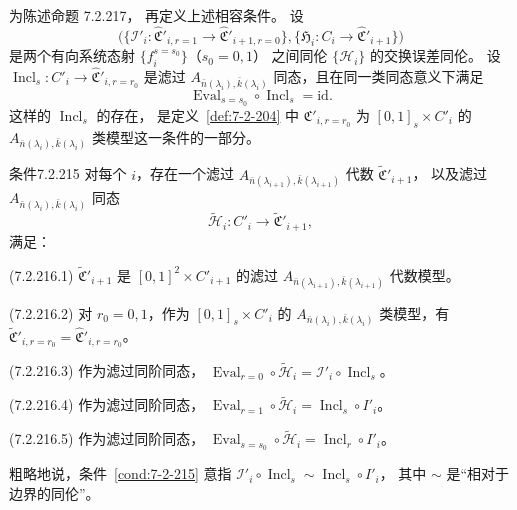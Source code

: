 为陈述命题 7.2.217，
再定义上述相容条件。
设
\[
\bigl(
\{\mathcal I'_i\colon
\widehat{\mathfrak C}'_{i,r=1}
\to\widehat{\mathfrak C}'_{i+1,r=0}\},
\{\mathfrak H_i\colon C_i\to
\widehat{\mathfrak C}'_{i+1}\}
\bigr)
\]
是两个有向系统态射
$\{f_i^{s=s_0}\}$（$s_0=0,1$）
之间同伦 $\{\mathcal H_i\}$ 的交换误差同伦。
设 $\operatorname{Incl}_s\colon C'_i\to
\widehat{\mathfrak C}'_{i,r=r_0}$
是滤过
$A_{\bar n(\lambda_i),\bar k(\lambda_i)}$
同态，且在同一类同态意义下满足
\[
\operatorname{Eval}_{s=s_0}
\circ\operatorname{Incl}_s=\mathrm{id}.
\]
这样的 $\operatorname{Incl}_s$ 的存在，
是定义~\ref{def:7-2-204} 中
$\widehat{\mathfrak C}'_{i,r=r_0}$
为 $[0,1]_s\times C'_i$ 的
$A_{\bar n(\lambda_i),\bar k(\lambda_i)}$
类模型这一条件的一部分。

\begin{statement}{条件}{7.2.215}\label{cond:7-2-215}
对每个 $i$，存在一个滤过
$A_{\bar n(\lambda_{i+1}),\bar k(\lambda_{i+1})}$
代数 $\widetilde{\mathfrak C}'_{i+1}$，
以及滤过
$A_{\bar n(\lambda_i),\bar k(\lambda_i)}$
同态
\[
\widetilde{\mathcal H}_i\colon C'_i
\longrightarrow\widetilde{\mathfrak C}'_{i+1},
\]
满足：

\noindent\textup{(7.2.216.1)}
$\widetilde{\mathfrak C}'_{i+1}$ 是
$[0,1]^2\times C'_{i+1}$ 的滤过
$A_{\bar n(\lambda_{i+1}),\bar k(\lambda_{i+1})}$
代数模型。

\noindent\textup{(7.2.216.2)}
对 $r_0=0,1$，作为
$[0,1]_s\times C'_i$ 的
$A_{\bar n(\lambda_i),\bar k(\lambda_i)}$
类模型，有
$\widetilde{\mathfrak C}'_{i,r=r_0}
=\widehat{\mathfrak C}'_{i,r=r_0}$。

\noindent\textup{(7.2.216.3)}
作为滤过同阶同态，
$\operatorname{Eval}_{r=0}\circ
\widetilde{\mathcal H}_i
=\mathcal I'_i\circ\operatorname{Incl}_s$。

\noindent\textup{(7.2.216.4)}
作为滤过同阶同态，
$\operatorname{Eval}_{r=1}\circ
\widetilde{\mathcal H}_i
=\operatorname{Incl}_s\circ I'_i$。

\noindent\textup{(7.2.216.5)}
作为滤过同阶同态，
$\operatorname{Eval}_{s=s_0}\circ
\widetilde{\mathcal H}_i
=\operatorname{Incl}_r\circ I'_i$。
\end{statement}

粗略地说，条件~\ref{cond:7-2-215}
意指
$\mathcal I'_i\circ\operatorname{Incl}_s
\sim\operatorname{Incl}_s\circ I'_i$，
其中 $\sim$ 是“相对于边界的同伦”。

